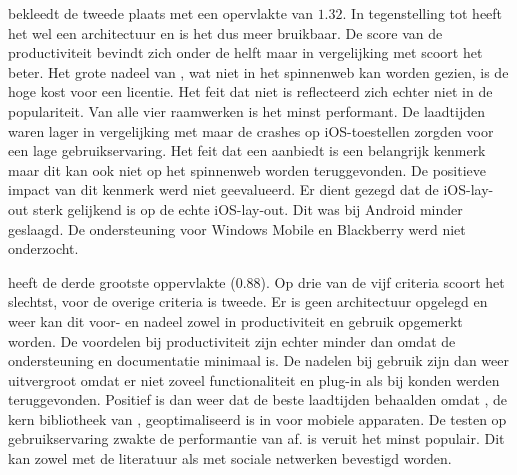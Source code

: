 \kendo{} bekleedt de tweede plaats met een opervlakte van $1.32$.
In tegenstelling tot \jqm{} heeft het wel een architectuur en is het dus meer bruikbaar.
De score van de productiviteit bevindt zich onder de helft maar in vergelijking met \st{} scoort het beter.
Het grote nadeel van \kendo{},  wat niet in het spinnenweb kan worden gezien,  is de hoge kost voor een licentie.
Het feit dat \kendo{} niet  is reflecteerd zich echter niet in de populariteit.
Van alle vier raamwerken is \kendo{} het minst performant.
De laadtijden waren lager in vergelijking met \st{} maar de crashes op iOS-toestellen zorgden voor een lage gebruikservaring.
Het feit dat \kendo{} een  aanbiedt is een belangrijk kenmerk maar dit kan ook niet op het spinnenweb worden teruggevonden.
De positieve impact van dit kenmerk werd niet geevalueerd.
Er dient gezegd dat de iOS-lay-out sterk gelijkend is op de echte iOS-lay-out.
Dit was bij Android minder geslaagd.
De ondersteuning voor Windows Mobile en Blackberry werd niet onderzocht.


\lungo{} heeft de derde grootste oppervlakte ($0.88$).
Op drie van de vijf criteria scoort \lungo{} het slechtst,  voor de overige criteria is \lungo{} tweede.
Er is geen architectuur opgelegd en weer kan dit voor- en nadeel zowel in productiviteit en gebruik opgemerkt worden.
De voordelen bij productiviteit zijn echter minder dan \jqm{} omdat de ondersteuning en documentatie minimaal is.
De nadelen bij gebruik zijn dan weer uitvergroot omdat er niet zoveel functionaliteit en plug-in als bij \jqm{} konden werden teruggevonden.
Positief is dan weer dat \lungo{} de beste laadtijden behaalden omdat \quo{}, de kern bibliotheek van \lungo{},  geoptimaliseerd is in voor mobiele apparaten.
De testen op gebruikservaring zwakte de performantie van \lungo{} af.
\lungo{} is veruit het minst populair.
Dit kan zowel met de literatuur als met sociale netwerken bevestigd worden.


